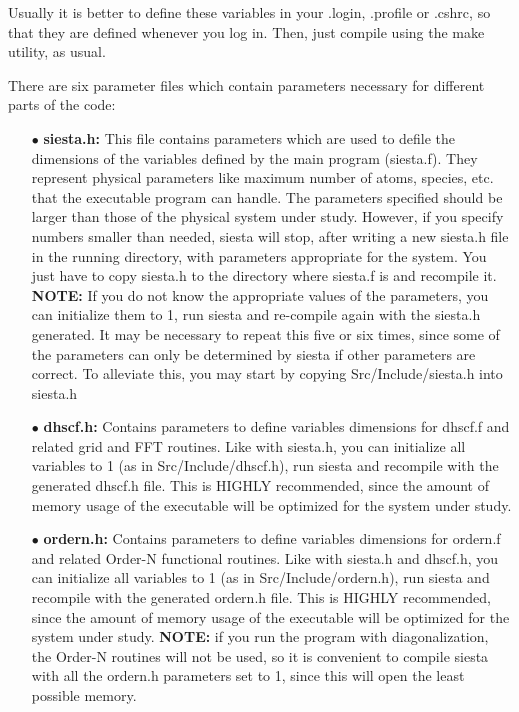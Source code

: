 \vspace{2pt}
\noindent
Usually it is better to define these variables in your
.login, .profile or .cshrc, so that they are defined
whenever you log in.
Then, just compile using the make utility, as usual.


There are six parameter files which contain
parameters necessary for different parts of the code:

\begin{itemize}

\item[$\bullet$] {\bf siesta.h:}
This file contains parameters which are used
to defile the dimensions of the variables defined by the
main program (siesta.f).  They represent physical parameters
like maximum number of atoms, species, etc. that the executable
program can handle. The parameters specified should be larger than
those of the physical system under study.  However, if you 
specify numbers smaller than needed, siesta will stop, after
writing a new siesta.h file in the running directory, 
with parameters appropriate for the system. You just have
to copy siesta.h to the directory where siesta.f is and recompile it.
{\bf NOTE:} If you do not know the appropriate values of the parameters,
you can initialize them to 1, run siesta and re-compile again with 
the siesta.h generated.  It may be necessary to repeat this five or six
times, since some of the parameters can only be determined by siesta
if other parameters are correct. To alleviate this, you may start by
copying Src/Include/siesta.h into siesta.h 

\item[$\bullet$] 
{\bf dhscf.h:} Contains parameters to define variables dimensions for
dhscf.f and related grid and FFT routines. Like with siesta.h,
you can initialize all variables to 1 (as in Src/Include/dhscf.h), 
run siesta and recompile with the generated dhscf.h file.  
This is HIGHLY recommended, since the amount of memory usage of the 
executable will be optimized for the system under study.

\item[$\bullet$] 
{\bf ordern.h:} Contains parameters to define variables dimensions for
ordern.f and related Order-N functional routines. Like with siesta.h
and dhscf.h, you can initialize all variables to 1 
(as in Src/Include/ordern.h), run siesta and
recompile with the generated ordern.h file.  This is HIGHLY recommended,
since the amount of memory usage of the executable will be optimized 
for the system under study.  {\bf NOTE:} if you run the program 
with diagonalization, the Order-N routines will not be used, so
it is convenient to compile siesta with all the ordern.h parameters
set to 1, since this will open the least possible memory. 


\end{itemize}

